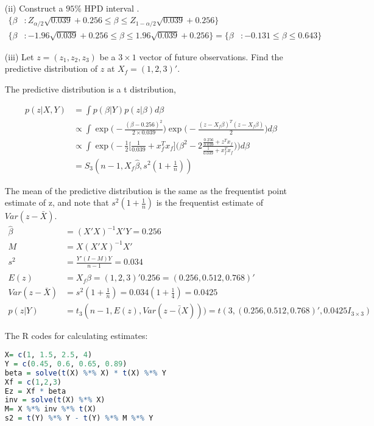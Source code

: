 \begin{itemize}
\begin{itemize}
\item[(ii)] Construct a $95\%$ HPD interval .
\begin{align*}
\Bigg \{\beta &: Z_{\alpha/2} \sqrt{0.039} + 0.256 \leq \beta \leq  Z_{1-\alpha/2} \sqrt{0.039} + 0.256 \Bigg \} \\
\Bigg \{\beta &: -1.96 \sqrt{0.039} + 0.256 \leq \beta \leq  1.96 \sqrt{0.039} + 0.256 \Bigg \} = \Bigg \{\beta &: -0.131 \leq \beta \leq  0.643 \Bigg \}
\end{align*}

\item[(iii)] Let $z = (z_1, z_2, z_3)$ be a $3 \times 1$ vector of future observations. Find the predictive distribution of $z$ at $X_f = (1,2,3)'$.

The predictive distribution is a t distribution, 

\begin{align*}
p(z| X, Y) &= \int p(\beta | Y) p(z| \beta) d\beta \\
& \propto \int  \exp \Big(-\frac{(\beta - 0.256)^2}{2 \times 0.039} \Big) \exp \Big(- \frac{ (z- X_f \beta)^T (z- X_f \beta)}{2} \Big) d\beta \\
& \propto \int \exp \Big(-\frac{1}{2} \Big[ \frac{1}{0.039} + x_f^T x_f \Big] \Big( \beta^2 - 2\frac{\frac{0.256}{0.039} + z^T x_f}{\frac{1}{0.039} + x_f^T x_f } \Big ) \Big) d\beta \\
&= S_3 (n-1, X_f \hat{\beta}, s^2(1 + \frac{1}{n}))
\end{align*}

The mean of the predictive distribution is the same as the frequentist point estimate of z, and note that $s^2(1 + \frac{1}{n})$ is the frequentist estimate of $Var(z - \bar{X})$.
\begin{align*}
\hat{\beta} &= (X'X)^{-1} X' Y = 0.256\\
M &= X (X'X)^{-1} X' \\
s^2 &= \frac{Y' (I-M) Y}{n-1} = 0.034\\
E(z) &= X_f \hat{\beta} = (1,2,3)' 0.256 = (0.256, 0.512, 0.768)' \\
Var(z - \bar{X}) &=  s^2(1 + \frac{1}{n}) = 0.034 (1 + \frac{1}{4}) = 0.0425\\
p(z| Y) &= t_3 ( n-1, E(z), Var(z- \bar(X))) = t(3, (0.256, 0.512, 0.768)', 0.0425 I_{3 \times 3})
\end{align*}

The R codes for calculating estimates:

\begin{lstlisting}[language=R]
X= c(1, 1.5, 2.5, 4) 
Y = c(0.45, 0.6, 0.65, 0.89)
beta = solve(t(X) %*% X) * t(X) %*% Y
Xf = c(1,2,3)
Ez = Xf * beta
inv = solve(t(X) %*% X)
M= X %*% inv %*% t(X)
s2 = t(Y) %*% Y - t(Y) %*% M %*% Y
\end{lstlisting}


\end{itemize}
\end{itemize}
